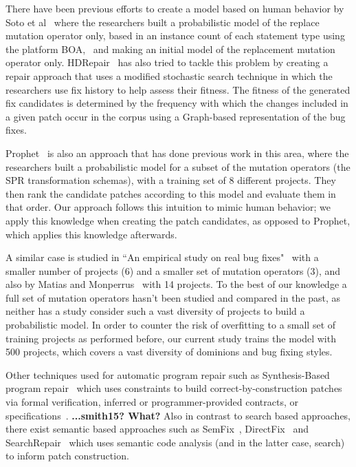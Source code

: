 \documentclass[conference]{IEEEtran}
\newcommand{\todo}[1]
  {{\scriptsize \textbf{\color{red} {#1}}}}
\begin{document}
There have been previous efforts to create a model based on human behavior by Soto et al~\cite{Soto15} 
where the researchers built a probabilistic model of the replace mutation 
operator only, based in 
an instance count of each statement type using the platform 
BOA,~\cite{dyer2013} and making an initial model of the replacement mutation 
operator only. HDRepair~\cite{xuan16} has also tried to tackle this problem by 
creating a repair approach that uses a modified stochastic search
technique in which the researchers use fix history
to help assess their fitness. The fitness of the generated
fix candidates is determined by the frequency with which the changes included in a given patch occur in the corpus using a Graph-based representation of the bug fixes.

Prophet~\cite{long15} is also an approach that has done previous work in this 
area, where the researchers built a 
probabilistic model for a subset of the mutation operators (the SPR transformation schemas), with a training set 
of 8 different projects. They then rank the candidate patches according to this model and evaluate them in that order. Our approach follows this intuition to mimic human behavior; we apply this knowledge when creating the patch candidates, as opposed to Prophet, which applies this knowledge afterwards. 

A similar case is studied in ``An empirical study on 
real bug fixes"~\cite{zhong15} with a smaller number of projects (6) and a 
smaller set of 
mutation operators (3), and also by Matias and Monperrus~\cite{matias15} with 14 
projects. To the best of our knowledge a full set of mutation 
operators hasn't been studied and compared in the past, as neither has a study 
consider such a vast diversity of projects to build a probabilistic model. In 
order to counter the 
risk of overfitting to a small set of training projects as performed before, our 
current study trains the model with 500 projects, which covers a vast diversity 
of dominions and bug fixing styles.


Other techniques used for
automatic program repair such as Synthesis-Based program
repair~\cite{jin11,pei14} which uses constraints to build
correct-by-construction patches via formal verification, inferred or
programmer-provided contracts, or
specifications~\cite{smith15}.\todo{...smith15?  What?} Also in contrast to
search based approaches, there exist semantic based approaches such as
SemFix~\cite{nguyen13}, DirectFix~\cite{mechtaev15} and SearchRepair~\cite{ke15}
which uses semantic code analysis (and in the latter case, search) to inform
patch construction.
\end{document}

